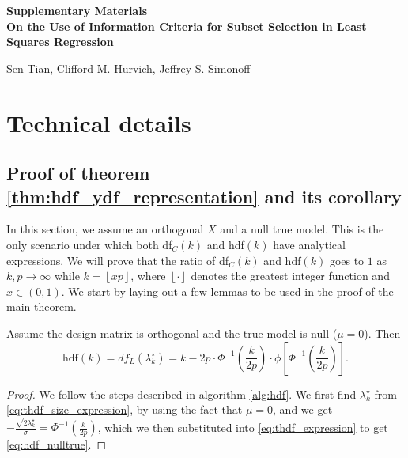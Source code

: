 \beginsupplement
\appendix
{}
\begin{center}
\textbf{\large Supplementary Materials \\
On the Use of Information Criteria for Subset Selection in Least Squares Regression}

Sen Tian, Clifford M. Hurvich, Jeffrey S. Simonoff
\end{center}

\section{Technical details}
\subsection{Proof of theorem \ref{thm:hdf_ydf_representation} and its corollary}
\label{sec:proof_hdf_ydf}
In this section, we assume an orthogonal $X$ and a null true model. This is the only scenario under which both df$_C(k)$ and hdf$(k)$ have analytical expressions. We will prove that the ratio of df$_C(k)$ and hdf$(k)$ goes to $1$ as $k,p\rightarrow \infty$ while $k=\left \lfloor{xp}\right \rfloor $, where $\left \lfloor{\cdot}\right \rfloor$ denotes the greatest integer function and $x\in(0,1)$. We start by laying out a few lemmas to be used in the proof of the main theorem.
\begin{lemma}
	\label{lemma:hdf_nulltrue}
	Assume the design matrix is orthogonal and the true model is null ($\mu=0$). Then
	\begin{equation}
	\text{hdf}(k) = df_L(\lambda_k^\star) = k - 2p\cdot \Phi^{-1} \left(\frac{k}{2p}\right) \cdot \phi\left[\Phi^{-1}\left(\frac{k}{2p}\right) \right].
	\label{eq:hdf_nulltrue}
	\end{equation}
\end{lemma}
\begin{proof}
	We follow the steps described in algorithm \ref{alg:hdf}. We first find $\lambda_k^\star$ from \eqref{eq:thdf_size_expression}, by using the fact that $\mu=0$, and we get $\displaystyle -\frac{\sqrt{2\lambda_k^\star}}{\sigma} = \displaystyle \Phi^{-1}\left(\frac{k}{2p}\right)$, which we then substituted into \eqref{eq:thdf_expression} to get \eqref{eq:hdf_nulltrue}.
\end{proof}

